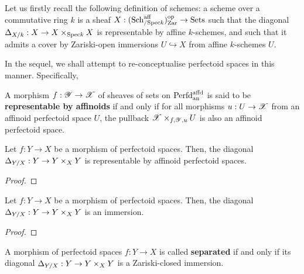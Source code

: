             \begin{remark} 
                Let us firstly recall the following definition of schemes: a scheme over a commutative ring $k$ is a sheaf $X: (\mathrm{Sch}_{/\mathrm{Spec} k}^{\mathrm{aff}})_{\mathrm{Zar}}^{\mathrm{op}} \to \mathrm{Sets}$ such that the diagonal $\Delta_{X/k}: X \to X \x_{\Spec k} X$ is representable by affine $k$-schemes, and such that it admits a cover by Zariski-open immersions $U \hookrightarrow X$ from affine $k$-schemes $U$.
                
                In the sequel, we shall attempt to re-conceptualise perfectoid spaces in this manner. Specifically, 
            \end{remark}
            \begin{definition} \label{def: representable_morphisms_of_perfectoid_spaces}
                A morphism $f: \mathscr{Y} \to \mathscr{X}$ of sheaves of sets on $\mathrm{Perfd}^{\mathrm{affd}}_{\mathrm{an}}$ is said to be \textbf{representable by affinoids} if and only if for all morphisms $u: U \to \mathscr{X}$ from an affinoid perfectoid space $U$, the pullback $\scrX \x_{f, \scrY, u} U$ is also an affinoid perfectoid space. 
            \end{definition}
            \begin{lemma} \label{lemma: diagonals_of_perfectoid_spaces_are_representable_by_affinoids}
                Let $f: Y \to X$ be a morphism of perfectoid spaces. Then, the diagonal $\Delta_{Y/X}: Y \to Y \x_X Y$ is representable by affinoid perfectoid spaces.
            \end{lemma}
                \begin{proof}
                    
                \end{proof}
            \begin{proposition} \label{prop: diagonals_of_perfectoid_spaces_are_immersions} 
                Let $f: Y \to X$ be a morphism of perfectoid spaces. Then, the diagonal $\Delta_{Y/X}: Y \to Y \x_X Y$ is an immersion.
            \end{proposition}
                \begin{proof}
                    
                \end{proof}
            \begin{definition} \label{def: separated_perfectoid_spaces}
                A morphism of perfectoid spaces $f: Y \to X$ is called \textbf{separated} if and only if its diagonal $\Delta_{Y/X}: Y \to Y \x_X Y$ is a Zariski-closed immersion.
            \end{definition}
        

